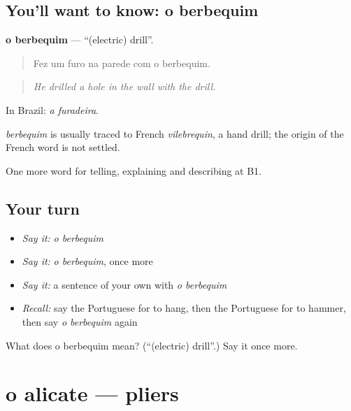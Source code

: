 \subsection*{You'll want to know: o berbequim}
\textbf{o berbequim} — \textquotedblleft{}(electric) drill\textquotedblright{}.

\begin{quote}
Fez um furo na parede com o berbequim.
\end{quote}

\begin{quote}
\emph{He drilled a hole in the wall with the drill.}
\end{quote}

In Brazil: \emph{a furadeira}.

\begin{cousinweb}
\emph{berbequim} is usually traced to French \emph{vilebrequin}, a hand drill; the origin of the French word is not settled.
\end{cousinweb}

\begin{grammarlens}[title={What you've built}]
One more word for telling, explaining and describing at B1.
\end{grammarlens}

\subsection*{Your turn}
\begin{itemize}
\raggedright
  \item \emph{Say it:} \emph{o berbequim}
  \item \emph{Say it:} \emph{o berbequim}, once more
  \item \emph{Say it:} a sentence of your own with \emph{o berbequim}
  \item \emph{Recall:} say the Portuguese for to hang, then the Portuguese for to hammer, then say \emph{o berbequim} again
\end{itemize}

\begin{tcolorbox}[breakable,colback=teal!4,colframe=teal!35!black,title={Before you move on}]
What does o berbequim mean? (\textquotedblleft{}(electric) drill\textquotedblright{}.) Say it once more.
\end{tcolorbox}
\section[o alicate]{o alicate — pliers}

